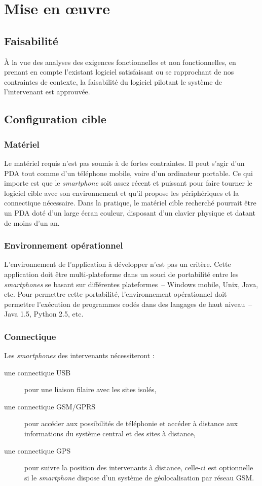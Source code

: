 \documentclass[a4paper, 11pt, final]{article}
\begin{document}
\section{Mise en œuvre}

\subsection{Faisabilité}
À la vue des analyses des exigences fonctionnelles et non fonctionnelles, en prenant en compte l'existant logiciel satisfaisant ou se rapprochant de nos contraintes de contexte, la faisabilité du logiciel pilotant le système de l'intervenant est approuvée.

\subsection{Configuration cible}

\subsubsection{Matériel}
Le matériel requis n'est pas soumis à de fortes contraintes. Il peut s'agir d'un PDA tout comme d'un téléphone mobile, voire d'un ordinateur portable. Ce qui importe est que le \textit{smartphone} soit assez récent et puissant pour faire tourner le logiciel cible avec son environnement et qu'il propose les périphériques et la connectique nécessaire. Dans la pratique, le matériel cible recherché pourrait être un PDA doté d'un large écran couleur, disposant d'un clavier physique et datant de moins d'un an.

\subsubsection{Environnement opérationnel}
L'environnement de l'application à développer n'est pas un critère. Cette application doit être multi-plateforme dans un souci de portabilité entre les \textit{smartphones} se basant sur différentes plateformes~-- Windows mobile, Unix, Java, etc. Pour permettre cette portabilité, l'environnement opérationnel doit permettre l'exécution de programmes codés dans des langages de haut niveau~-- Java 1.5, Python 2.5, etc.

\subsubsection{Connectique}
Les \emph{smartphones} des intervenants nécessiteront :
\begin{description}
\item[une connectique USB] pour une liaison filaire avec les sites isolés,
\item[une connectique GSM/GPRS] pour accéder aux possibilités de téléphonie et accéder à distance aux informations du système central et des sites à distance,
\item[une connectique GPS] pour suivre la position des intervenants à distance, celle-ci est optionnelle si le \emph{smartphone} dispose d'un système de géolocalisation par réseau GSM.
\end{description}
\end{document}
